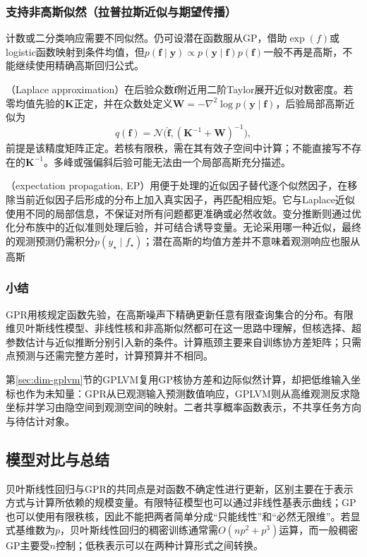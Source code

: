 \subsubsection{支持非高斯似然（拉普拉斯近似与期望传播）}
\label{sec:regression-gp-nongaussian}

计数或二分类响应需要不同似然。仍可设潜在函数服从GP，借助$\exp(f)$或logistic函数映射到条件均值，但$p(\bm{f}\mid\bm{y})\propto p(\bm{y}\mid\bm{f})p(\bm{f})$一般不再是高斯，不能继续使用精确高斯回归公式。

（Laplace approximation）在后验众数$\widehat{\bm{f}}$附近用二阶Taylor展开近似对数密度。若零均值先验的$\bm{K}$正定，并在众数处定义$\bm{W}=-\nabla^2\log p(\bm{y}\mid\bm{f})$，后验局部高斯近似为
\[
  q(\bm{f})=\mathcal{N}\bigl(
       \widehat{\bm{f}},(\bm{K}^{-1}+\bm{W})^{-1}\bigr),
\]
前提是该精度矩阵正定。若核有限秩，需在其有效子空间中计算；不能直接写不存在的$\bm{K}^{-1}$。多峰或强偏斜后验可能无法由一个局部高斯充分描述。

（expectation propagation, EP）用便于处理的近似因子替代逐个似然因子，在移除当前近似因子后形成的分布上加入真实因子，再匹配相应矩。它与Laplace近似使用不同的局部信息，不保证对所有问题都更准确或必然收敛。变分推断则通过优化分布族中的近似准则处理后验，并可结合诱导变量。无论采用哪一种近似，最终的观测预测仍需积分$p(y_{\star}\mid f_{\star})$；潜在高斯的均值方差并不意味着观测响应也服从高斯

\subsubsection{小结}

GPR用核规定函数先验，在高斯噪声下精确更新任意有限查询集合的分布。有限维贝叶斯线性模型、非线性核和非高斯似然都可在这一思路中理解，但核选择、超参数估计与近似推断分别引入新的条件。计算瓶颈主要来自训练协方差矩阵；只需点预测与还需完整方差时，计算预算并不相同。

第\ref{sec:dim-gplvm}节的GPLVM复用GP核协方差和边际似然计算，却把低维输入坐标也作为未知量：GPR从已观测输入预测数值响应，GPLVM则从高维观测反求隐坐标并学习由隐空间到观测空间的映射。二者共享概率函数表示，不共享任务方向与待估计对象。

\subsection{模型对比与总结}

贝叶斯线性回归与GPR的共同点是对函数不确定性进行更新，区别主要在于表示方式与计算所依赖的规模变量。有限特征模型也可以通过非线性基表示曲线；GP也可以使用有限秩核，因此不能把两者简单分成“只能线性”和“必然无限维”。若显式基维数为$p$，贝叶斯线性回归的稠密训练通常需$O(np^2+p^3)$运算，而一般稠密GP主要受$n$控制；低秩表示可以在两种计算形式之间转换。

